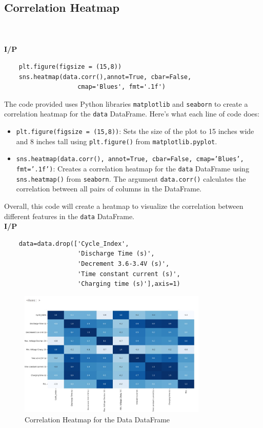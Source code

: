 \subsection{Correlation Heatmap}\\
\\
\noindent
\textbf{I/P} \\[-1.5em] %
\begin{verbatim}
    plt.figure(figsize = (15,8)) 
    sns.heatmap(data.corr(),annot=True, cbar=False, 
                    cmap='Blues', fmt='.1f')  
\end{verbatim}
The code provided uses Python libraries \texttt{matplotlib} and \texttt{seaborn} to create a correlation heatmap for the \texttt{data} DataFrame. Here’s what each line of code does:
\begin{itemize}
    \item \texttt{plt.figure(figsize = (15,8))}: Sets the size of the plot to 15 inches wide and 8 inches tall using \texttt{plt.figure()} from \texttt{matplotlib.pyplot}.
    \item \texttt{sns.heatmap(data.corr(), annot=True, cbar=False, cmap='Blues', fmt='.1f')}: Creates a correlation heatmap for the \texttt{data} DataFrame using \texttt{sns.heatmap()} from \texttt{seaborn}. The argument \texttt{data.corr()} calculates the correlation between all pairs of columns in the DataFrame.
\end{itemize}
Overall, this code will create a heatmap to visualize the correlation between different features in the \texttt{data} DataFrame.\\
\newpage
\noindent
\textbf{I/P} \\[-2.5em] %
\begin{verbatim}
    data=data.drop(['Cycle_Index',
                    'Discharge Time (s)', 
                    'Decrement 3.6-3.4V (s)', 
                    'Time constant current (s)',
                    'Charging time (s)'],axis=1)  
\end{verbatim}
\begin{figure}[H]
    \centering
    \includegraphics[width=0.8\textwidth]{correlation_heatmap.jpg}
    \caption{Correlation Heatmap for the Data DataFrame}
    \label{fig:correlation_heatmap}
\end{figure}

